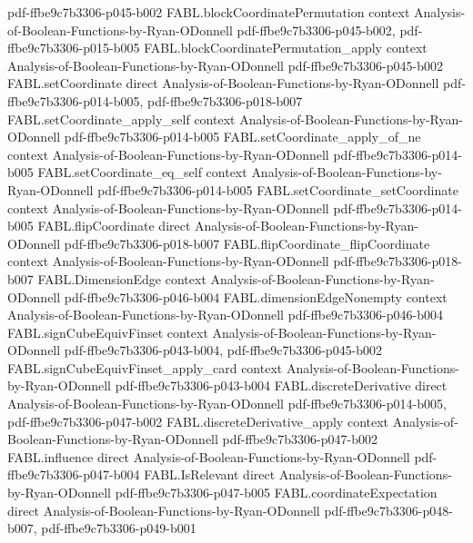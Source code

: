 \begin{theorem}
  {pdf-ffbe9c7b3306-p045-b002}
\proofstep
  {FABL.blockCoordinatePermutation}
  {context}
  {Analysis-of-Boolean-Functions-by-Ryan-ODonnell}
  {pdf-ffbe9c7b3306-p045-b002,
    pdf-ffbe9c7b3306-p015-b005}
\proofstep
  {FABL.blockCoordinatePermutation_apply}
  {context}
  {Analysis-of-Boolean-Functions-by-Ryan-ODonnell}
  {pdf-ffbe9c7b3306-p045-b002}
\proofstep
  {FABL.setCoordinate}
  {direct}
  {Analysis-of-Boolean-Functions-by-Ryan-ODonnell}
  {pdf-ffbe9c7b3306-p014-b005,
    pdf-ffbe9c7b3306-p018-b007}
\proofstep
  {FABL.setCoordinate_apply_self}
  {context}
  {Analysis-of-Boolean-Functions-by-Ryan-ODonnell}
  {pdf-ffbe9c7b3306-p014-b005}
\proofstep
  {FABL.setCoordinate_apply_of_ne}
  {context}
  {Analysis-of-Boolean-Functions-by-Ryan-ODonnell}
  {pdf-ffbe9c7b3306-p014-b005}
\proofstep
  {FABL.setCoordinate_eq_self}
  {context}
  {Analysis-of-Boolean-Functions-by-Ryan-ODonnell}
  {pdf-ffbe9c7b3306-p014-b005}
\proofstep
  {FABL.setCoordinate_setCoordinate}
  {context}
  {Analysis-of-Boolean-Functions-by-Ryan-ODonnell}
  {pdf-ffbe9c7b3306-p014-b005}
\proofstep
  {FABL.flipCoordinate}
  {direct}
  {Analysis-of-Boolean-Functions-by-Ryan-ODonnell}
  {pdf-ffbe9c7b3306-p018-b007}
\proofstep
  {FABL.flipCoordinate_flipCoordinate}
  {context}
  {Analysis-of-Boolean-Functions-by-Ryan-ODonnell}
  {pdf-ffbe9c7b3306-p018-b007}
\proofstep
  {FABL.DimensionEdge}
  {context}
  {Analysis-of-Boolean-Functions-by-Ryan-ODonnell}
  {pdf-ffbe9c7b3306-p046-b004}
\proofstep
  {FABL.dimensionEdgeNonempty}
  {context}
  {Analysis-of-Boolean-Functions-by-Ryan-ODonnell}
  {pdf-ffbe9c7b3306-p046-b004}
\proofstep
  {FABL.signCubeEquivFinset}
  {context}
  {Analysis-of-Boolean-Functions-by-Ryan-ODonnell}
  {pdf-ffbe9c7b3306-p043-b004,
    pdf-ffbe9c7b3306-p045-b002}
\proofstep
  {FABL.signCubeEquivFinset_apply_card}
  {context}
  {Analysis-of-Boolean-Functions-by-Ryan-ODonnell}
  {pdf-ffbe9c7b3306-p043-b004}
\proofstep
  {FABL.discreteDerivative}
  {direct}
  {Analysis-of-Boolean-Functions-by-Ryan-ODonnell}
  {pdf-ffbe9c7b3306-p014-b005,
    pdf-ffbe9c7b3306-p047-b002}
\proofstep
  {FABL.discreteDerivative_apply}
  {context}
  {Analysis-of-Boolean-Functions-by-Ryan-ODonnell}
  {pdf-ffbe9c7b3306-p047-b002}
\proofstep
  {FABL.influence}
  {direct}
  {Analysis-of-Boolean-Functions-by-Ryan-ODonnell}
  {pdf-ffbe9c7b3306-p047-b004}
\proofstep
  {FABL.IsRelevant}
  {direct}
  {Analysis-of-Boolean-Functions-by-Ryan-ODonnell}
  {pdf-ffbe9c7b3306-p047-b005}
\proofstep
  {FABL.coordinateExpectation}
  {direct}
  {Analysis-of-Boolean-Functions-by-Ryan-ODonnell}
  {pdf-ffbe9c7b3306-p048-b007,
    pdf-ffbe9c7b3306-p049-b001}

\end{theorem}
